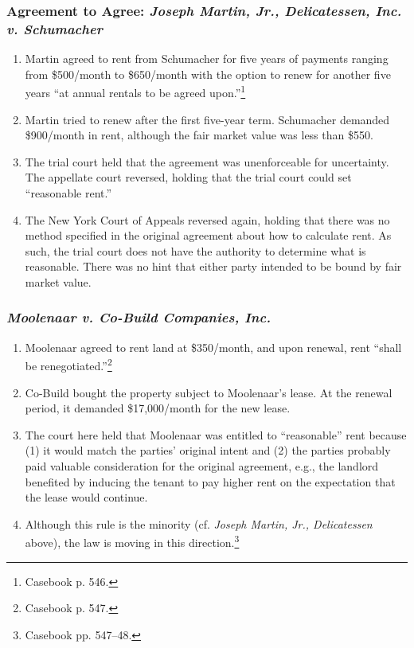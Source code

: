 \subsubsection{Agreement to Agree: \emph{Joseph Martin, Jr., Delicatessen, 
Inc. v. Schumacher}}

\begin{enumerate}
    \item Martin agreed to rent from Schumacher for five years of payments 
    ranging from \$500/month to \$650/month with the option to renew for 
    another five years ``at annual rentals to be agreed 
    upon.''\footnote{Casebook p. 546.}
    \item Martin tried to renew after the first five-year term. Schumacher 
    demanded \$900/month in rent, although the fair market value was less than 
    \$550.
    \item The trial court held that the agreement was unenforceable for 
    uncertainty. The appellate court reversed, holding that the trial court 
    could set ``reasonable rent.''
    \item The New York Court of Appeals reversed again, holding that there was 
    no method specified in the original agreement about how to calculate rent. 
    As such, the trial court does not have the authority to determine what is 
    reasonable. There was no hint that either party intended to be bound by 
    fair market value.
\end{enumerate}

\subsubsection{\emph{Moolenaar v. Co-Build Companies, Inc.}}

\begin{enumerate}
    \item Moolenaar agreed to rent land at \$350/month, and upon renewal, rent 
    ``shall be renegotiated.''\footnote{Casebook p. 547.}
    \item Co-Build bought the property subject to Moolenaar's lease. At the 
    renewal period, it demanded \$17,000/month for the new lease.
    \item The court here held that Moolenaar was entitled to ``reasonable'' 
    rent because (1) it would match the parties' original intent and (2) the 
    parties probably paid valuable consideration for the original agreement, 
    e.g., the landlord benefited by inducing the tenant to pay higher rent on 
    the expectation that the lease would continue.
    \item Although this rule is the minority (cf. \emph{Joseph Martin, Jr., 
    Delicatessen} above), the law is moving in this 
    direction.\footnote{Casebook pp. 547--48.}
\end{enumerate}


